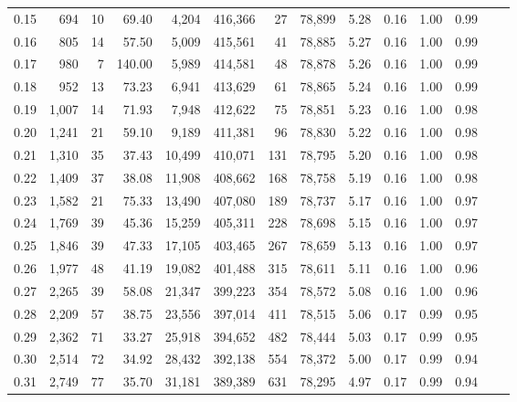\begin{tabular}{rrrrrrrrrrrrrr}
0.15 &    694 &     10 &   69.40 &    4,204 &  416,366 &      27 &  78,899 &  5.28 &  0.16 &  1.00 &      0.99 \\
0.16 &    805 &     14 &   57.50 &    5,009 &  415,561 &      41 &  78,885 &  5.27 &  0.16 &  1.00 &      0.99 \\
0.17 &    980 &      7 &  140.00 &    5,989 &  414,581 &      48 &  78,878 &  5.26 &  0.16 &  1.00 &      0.99 \\
0.18 &    952 &     13 &   73.23 &    6,941 &  413,629 &      61 &  78,865 &  5.24 &  0.16 &  1.00 &      0.99 \\
0.19 &  1,007 &     14 &   71.93 &    7,948 &  412,622 &      75 &  78,851 &  5.23 &  0.16 &  1.00 &      0.98 \\
0.20 &  1,241 &     21 &   59.10 &    9,189 &  411,381 &      96 &  78,830 &  5.22 &  0.16 &  1.00 &      0.98 \\
0.21 &  1,310 &     35 &   37.43 &   10,499 &  410,071 &     131 &  78,795 &  5.20 &  0.16 &  1.00 &      0.98 \\
0.22 &  1,409 &     37 &   38.08 &   11,908 &  408,662 &     168 &  78,758 &  5.19 &  0.16 &  1.00 &      0.98 \\
0.23 &  1,582 &     21 &   75.33 &   13,490 &  407,080 &     189 &  78,737 &  5.17 &  0.16 &  1.00 &      0.97 \\
0.24 &  1,769 &     39 &   45.36 &   15,259 &  405,311 &     228 &  78,698 &  5.15 &  0.16 &  1.00 &      0.97 \\
0.25 &  1,846 &     39 &   47.33 &   17,105 &  403,465 &     267 &  78,659 &  5.13 &  0.16 &  1.00 &      0.97 \\
0.26 &  1,977 &     48 &   41.19 &   19,082 &  401,488 &     315 &  78,611 &  5.11 &  0.16 &  1.00 &      0.96 \\
0.27 &  2,265 &     39 &   58.08 &   21,347 &  399,223 &     354 &  78,572 &  5.08 &  0.16 &  1.00 &      0.96 \\
0.28 &  2,209 &     57 &   38.75 &   23,556 &  397,014 &     411 &  78,515 &  5.06 &  0.17 &  0.99 &      0.95 \\
0.29 &  2,362 &     71 &   33.27 &   25,918 &  394,652 &     482 &  78,444 &  5.03 &  0.17 &  0.99 &      0.95 \\
0.30 &  2,514 &     72 &   34.92 &   28,432 &  392,138 &     554 &  78,372 &  5.00 &  0.17 &  0.99 &      0.94 \\
0.31 &  2,749 &     77 &   35.70 &   31,181 &  389,389 &     631 &  78,295 &  4.97 &  0.17 &  0.99 &      0.94 \\

\end{tabular}
